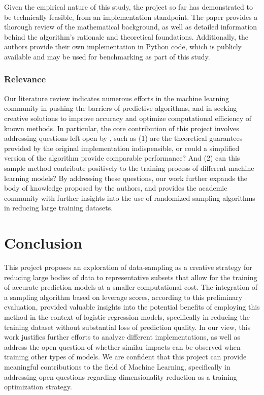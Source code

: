\documentclass{article}
\theoremstyle{plain}
\theoremstyle{definition}
\theoremstyle{remark}
\begin{document}
Given the empirical nature of this study, the project so far has demonstrated to be technically feasible, from an implementation standpoint. The paper \cite{chow24} provides a thorough review of the mathematical background, as well as detailed information behind the algorithm's rationale and theoretical foundations. Additionally, the authors provide their own implementation in Python code, which is publicly available and may be used for benchmarking as part of this study.


\subsubsection{Relevance}

Our literature review indicates numerous efforts in the machine learning community in pushing the barriers of predictive algorithms, and in seeking creative solutions to improve accuracy and optimize computational efficiency of known methods. In particular, the core contribution of this project involves addressing questions left open by \citeauthor{chow24}, such as (1) are the theoretical guarantees provided by the original implementation indispensible, or could a simplified version of the algorithm provide comparable performance? And (2) can this sample method contribute positively to the training process of different machine learning models? By addressing these questions, our work further expands the body of knowledge proposed by the authors, and provides the academic community with further insights into the use of randomized sampling algorithms in reducing large training datasets.


\section{Conclusion}

This project proposes an exploration of data-sampling as a creative strategy for reducing large bodies of data to representative subsets that allow for the training of accurate prediction models at a smaller computational cost. The integration of a sampling algorithm based on leverage scores, according to this preliminary evaluation, provided valuable insights into the potential benefits of employing this method in the context of logistic regression models, specifically in reducing the training dataset without substantial loss of prediction quality. In our view, this work justifies further efforts to analyze different implementations, as well as address the open question of whether similar impacts can be observed when training other types of models. We are confident that this project can provide meaningful contributions to the field of Machine Learning, specifically in addressing open questions regarding dimensionality reduction as a training optimization strategy.
\end{document}
